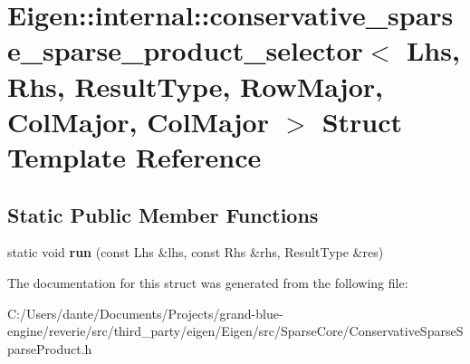\hypertarget{struct_eigen_1_1internal_1_1conservative__sparse__sparse__product__selector_3_01_lhs_00_01_rhs_0434d91bd03f3817d20ac2e65c68dd100}{}\section{Eigen\+::internal\+::conservative\+\_\+sparse\+\_\+sparse\+\_\+product\+\_\+selector$<$ Lhs, Rhs, Result\+Type, Row\+Major, Col\+Major, Col\+Major $>$ Struct Template Reference}
\label{struct_eigen_1_1internal_1_1conservative__sparse__sparse__product__selector_3_01_lhs_00_01_rhs_0434d91bd03f3817d20ac2e65c68dd100}
\subsection*{Static Public Member Functions}
\begin{DoxyCompactItemize}
\item 
\mbox{\label{struct_eigen_1_1internal_1_1conservative__sparse__sparse__product__selector_3_01_lhs_00_01_rhs_0434d91bd03f3817d20ac2e65c68dd100_af07c2f116084d68ee7070aaf2e1cbfe1}} 
static void {\bfseries run} (const Lhs \&lhs, const Rhs \&rhs, Result\+Type \&res)
\end{DoxyCompactItemize}


The documentation for this struct was generated from the following file\+:\begin{DoxyCompactItemize}
\item 
C\+:/\+Users/dante/\+Documents/\+Projects/grand-\/blue-\/engine/reverie/src/third\+\_\+party/eigen/\+Eigen/src/\+Sparse\+Core/Conservative\+Sparse\+Sparse\+Product.\+h\end{DoxyCompactItemize}
